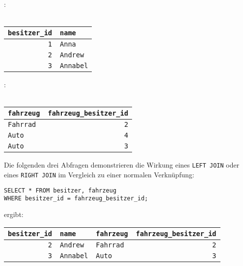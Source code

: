 \begin{minipage}{0.30\textwidth}
:\\ \\
\begin{tabular}{|r|l|}
\hline
\textbf{\texttt{besitzer\_id}} & \textbf{\texttt{name}} \\ \hline
\texttt{1} & \texttt{Anna} \\ \hline
\texttt{2} & \texttt{Andrew} \\ \hline
\texttt{3} & \texttt{Annabel} \\ \hline
\end{tabular}
\end{minipage}\hfill
\begin{minipage}{0.55\textwidth}
:\\ \\
\begin{tabular}{|l|r|}
\hline
\textbf{\texttt{fahrzeug}} & \textbf{\texttt{fahrzeug\_besitzer\_id}} \\ \hline
\texttt{Fahrrad} & \texttt{2} \\ \hline
\texttt{Auto} & \texttt{4} \\ \hline
\texttt{Auto} & \texttt{3} \\ \hline
\end{tabular}
\end{minipage}

Die folgenden drei Abfragen demonstrieren die Wirkung eines
\lstinline{LEFT JOIN} oder eines \lstinline{RIGHT JOIN} im Vergleich zu einer
normalen Verknüpfung:

\begin{lstlisting}
SELECT * FROM besitzer, fahrzeug
WHERE besitzer_id = fahrzeug_besitzer_id;
\end{lstlisting}

ergibt:

\begin{tabular}{|r|l|l|r|}
\hline
\textbf{\texttt{besitzer\_id}} & \textbf{\texttt{name}} &
\textbf{\texttt{fahrzeug}} & \textbf{\texttt{fahrzeug\_besitzer\_id}}\\
\hline 
\texttt{2} & \texttt{Andrew} & \texttt{Fahrrad} & \texttt{2}\\
\hline
\texttt{3} & \texttt{Annabel} & \texttt{Auto} & \texttt{3}\\
\hline
\end{tabular}

